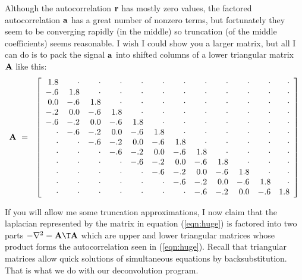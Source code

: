\par

Although the autocorrelation $\bold r$ has mostly zero values,
the factored autocorrelation $\bold a$ has a great number of nonzero terms,
but fortunately they seem to be converging rapidly (in the middle)
so truncation (of the middle coefficients) seems reasonable.
I wish I could show you a larger matrix, but all I can do is to pack
the signal $\bold a$ into shifted columns of
a lower triangular matrix $\bold A$ like this:
\begin{equation}
\bold A \ = \ \ 
\left[
\begin{array}{rrrrrrrrrrrr}
  1.8&\cdot&\cdot&\cdot&\cdot&\cdot&\cdot&\cdot&\cdot&\cdot&\cdot&\cdot\\
  -.6&  1.8&\cdot&\cdot&\cdot&\cdot&\cdot&\cdot&\cdot&\cdot&\cdot&\cdot\\
  0.0&  -.6&  1.8&\cdot&\cdot&\cdot&\cdot&\cdot&\cdot&\cdot&\cdot&\cdot\\
  -.2&  0.0&  -.6&  1.8&\cdot&\cdot&\cdot&\cdot&\cdot&\cdot&\cdot&\cdot\\
  -.6&  -.2&  0.0&  -.6&  1.8&\cdot&\cdot&\cdot&\cdot&\cdot&\cdot&\cdot\\
\cdot&  -.6&  -.2&  0.0&  -.6&  1.8&\cdot&\cdot&\cdot&\cdot&\cdot&\cdot\\
\cdot&\cdot&  -.6&  -.2&  0.0&  -.6&  1.8&\cdot&\cdot&\cdot&\cdot&\cdot\\
\cdot&\cdot&\cdot&  -.6&  -.2&  0.0&  -.6&  1.8&\cdot&\cdot&\cdot&\cdot\\
\cdot&\cdot&\cdot&\cdot&  -.6&  -.2&  0.0&  -.6&  1.8&\cdot&\cdot&\cdot\\
\cdot&\cdot&\cdot&\cdot&\cdot&  -.6&  -.2&  0.0&  -.6&  1.8&\cdot&\cdot\\
\cdot&\cdot&\cdot&\cdot&\cdot&\cdot&  -.6&  -.2&  0.0&  -.6&  1.8&\cdot\\
\cdot&\cdot&\cdot&\cdot&\cdot&\cdot&\cdot&  -.6&  -.2&  0.0&  -.6&  1.8
\end{array}
\right]
\label{eqn:lapfacmat}
\end{equation}

If you will allow me some truncation approximations,
I now claim that the laplacian represented by the
matrix in equation (\ref{eqn:huge})
is factored into two parts
$-\nabla^2 =\bold A\T\bold A$
which are upper and lower triangular matrices
whose product forms the autocorrelation seen in (\ref{eqn:huge}).
Recall that triangular matrices
allow quick solutions of simultaneous equations by backsubstitution.
That is what we do with our
deconvolution program.


